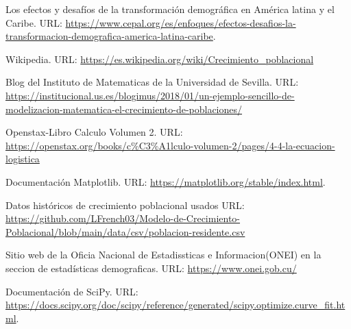 \documentclass[a4paper,10pt,twocolumn]{article}
\begin{document}
\begin{thebibliography}{99}
	 Los efectos y desafíos de la transformación demográfica en América latina y el Caribe. URL: \url{https://www.cepal.org/es/enfoques/efectos-desafios-la-transformacion-demografica-america-latina-caribe}.

	 Wikipedia. URL: \url{https://es.wikipedia.org/wiki/Crecimiento_poblacional}

	 Blog del Instituto de Matematicas de la Universidad de Sevilla. URL: \url{https://institucional.us.es/blogimus/2018/01/un-ejemplo-sencillo-de-modelizacion-matematica-el-crecimiento-de-poblaciones/}

	 Openstax-Libro Calculo Volumen 2. URL: \url{https://openstax.org/books/c%C3%A1lculo-volumen-2/pages/4-4-la-ecuacion-logistica}
	
	 Documentación Matplotlib. URL: \url{https://matplotlib.org/stable/index.html}.

	 Datos históricos de crecimiento poblacional usados URL: \url{https://github.com/LFrench03/Modelo-de-Crecimiento-Poblacional/blob/main/data/csv/poblacion-residente.csv}

	 Sitio web de la Oficia Nacional de Estadissticas e Informacion(ONEI) en la seccion de
	estadísticas demograficas. URL: \url{https://www.onei.gob.cu/}

	 Documentación de SciPy. URL: \url{https://docs.scipy.org/doc/scipy/reference/generated/scipy.optimize.curve_fit.html}.

\end{thebibliography}
\end{document}
